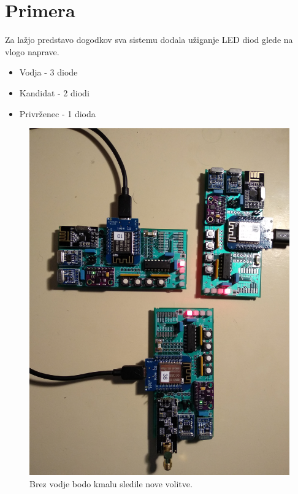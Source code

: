 \documentclass[runningheads]{llncs}
\begin{document}
\section{Primera}
Za lažjo predstavo dogodkov sva sistemu dodala užiganje LED diod glede na vlogo naprave.
\begin{itemize}
\item Vodja - 3 diode
\item Kandidat - 2 diodi
\item Privrženec - 1 dioda
\end{itemize}
\begin{figure}
  \includegraphics[width=\linewidth]{no_leader.jpg}
  \caption{Brez vodje bodo kmalu sledile nove volitve.}
  \label{fig:no_leader}
\end{figure}
\end{document}
